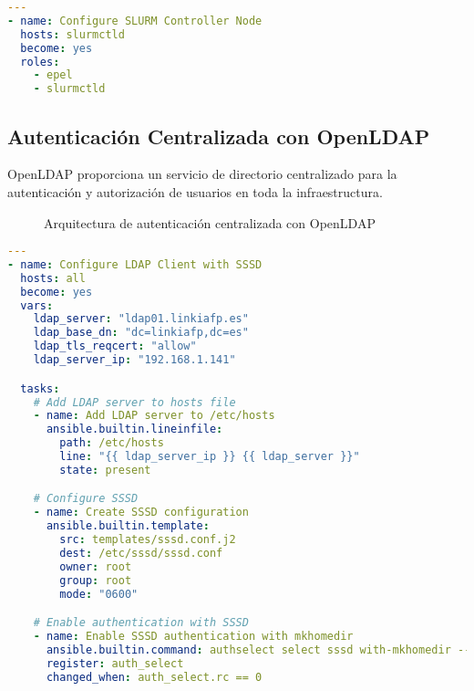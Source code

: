 \documentclass[12pt,a4paper]{article}
\begin{document}
\begin{lstlisting}[language=yaml, caption=Extracto del playbook slurmctld.yml]
---
- name: Configure SLURM Controller Node
  hosts: slurmctld
  become: yes
  roles:
    - epel
    - slurmctld
\end{lstlisting}

\subsection{Autenticación Centralizada con OpenLDAP}

OpenLDAP proporciona un servicio de directorio centralizado para la autenticación y autorización de usuarios en toda la infraestructura.

\begin{figure}[h]
\centering
{}
\caption{Arquitectura de autenticación centralizada con OpenLDAP}
\end{figure}

\begin{lstlisting}[language=yaml, caption=Extracto del playbook ldap-client.yml]
---
- name: Configure LDAP Client with SSSD
  hosts: all
  become: yes
  vars:
    ldap_server: "ldap01.linkiafp.es"
    ldap_base_dn: "dc=linkiafp,dc=es"
    ldap_tls_reqcert: "allow"
    ldap_server_ip: "192.168.1.141"

  tasks:
    # Add LDAP server to hosts file
    - name: Add LDAP server to /etc/hosts
      ansible.builtin.lineinfile:
        path: /etc/hosts
        line: "{{ ldap_server_ip }} {{ ldap_server }}"
        state: present

    # Configure SSSD
    - name: Create SSSD configuration
      ansible.builtin.template:
        src: templates/sssd.conf.j2
        dest: /etc/sssd/sssd.conf
        owner: root
        group: root
        mode: "0600"

    # Enable authentication with SSSD
    - name: Enable SSSD authentication with mkhomedir
      ansible.builtin.command: authselect select sssd with-mkhomedir --force
      register: auth_select
      changed_when: auth_select.rc == 0
\end{lstlisting}
\end{document}
